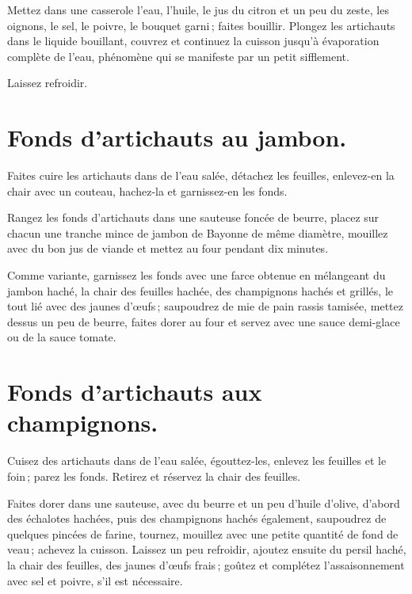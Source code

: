 Mettez dans une casserole l'eau, l'huile, le jus du citron et un peu du zeste,
les oignons, le sel, le poivre, le bouquet garni ; faites bouillir. Plongez les
artichauts dans le liquide bouillant, couvrez et continuez la cuisson jusqu'à
évaporation complète de l'eau, phénomène qui se manifeste par un petit
sifflement.

Laissez refroidir.

\section*{\centering Fonds d'artichauts au jambon.}
{}

Faites cuire les artichauts dans de l'eau salée, détachez les feuilles,
enlevez-en la chair avec un couteau, hachez-la et garnissez-en les fonds.

Rangez les fonds d'artichauts dans une sauteuse foncée de beurre, placez sur
chacun une tranche mince de jambon de Bayonne de même diamètre, mouillez
avec du bon jus de viande et mettez au four pendant dix minutes.

\sk

Comme variante, garnissez les fonds avec une farce obtenue en mélangeant du
jambon haché, la chair des feuilles hachée, des champignons hachés et grillés,
le tout lié avec des jaunes d'œufs ; saupoudrez de mie de pain rassis tamisée,
mettez dessus un peu de beurre, faites dorer au four et servez avec une sauce
demi-glace ou de la sauce tomate.

\section*{\centering Fonds d'artichauts aux champignons.}
{}

Cuisez des artichauts dans de l'eau salée, égouttez-les, enlevez les feuilles
et le foin ; parez les fonds. Retirez et réservez la chair des feuilles.

Faites dorer dans une sauteuse, avec du beurre et un peu d'huile d'olive,
d'abord des échalotes hachées, puis des champignons hachés également,
saupoudrez de quelques pincées de farine, tournez, mouillez avec une petite
quantité de fond de veau ; achevez la cuisson. Laissez un peu refroidir,
ajoutez ensuite du persil haché, la chair des feuilles, des jaunes d'œufs
frais ; goûtez et complétez l'assaisonnement avec sel et poivre, s'il est
nécessaire.


